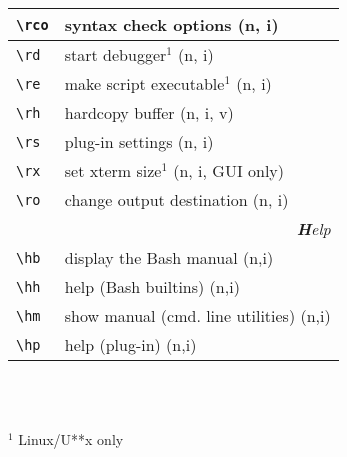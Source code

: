 \documentclass[oneside,10pt,landscape,DIV17]{scrartcl}
\begin{document}
\begin{multicols}{3}
\begin{center}
\begin{tabular}[]{|p{11mm}|p{62mm}|}
\hline \verb'\rco' & syntax check options              \hfill (n, i)\\
\hline \verb'\rd'  & start debugger$^1$                \hfill (n, i)\\
\hline \verb'\re'  & make script executable$^1$        \hfill (n, i)\\
\hline \verb'\rh'  & hardcopy buffer                   \hfill (n, i, v)\\
\hline \verb'\rs'  & plug-in settings                  \hfill (n, i)\\
\hline \verb'\rx'  & set xterm size$^1$                \hfill (n, i, GUI only)\\
\hline \verb'\ro'  & change output destination         \hfill (n, i)\\
\hline
\hline 
\multicolumn{2}{|r|}{\textsl{\textbf{H}elp}}\\[1.0ex]
\hline \verb'\hb'   & display the Bash manual           \hfill (n,i)\\
\hline \verb'\hh'   & help (Bash builtins)              \hfill (n,i)\\
\hline \verb'\hm'   & show manual (cmd. line utilities) \hfill (n,i)\\
\hline \verb'\hp'   & help (plug-in)                    \hfill (n,i)\\
\hline 
\end{tabular}\\
%
\vfill
%
\begin{minipage}[b]{75mm}%
\scriptsize{%
\vspace{10mm}
\hrulefill\\
$^1$ {Linux/U**x only}
}%
\end{minipage}\\
%
%
\end{center}%
\end{multicols}%
%
\end{document}
